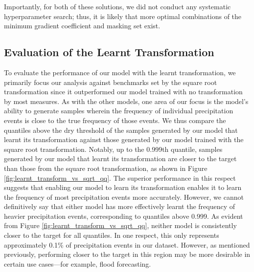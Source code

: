 \documentclass[ oneside,%
                    author={George Herbert},
                    degree={MSci},
                     title={Video Diffusion Models for Climate Simulations},
                  subtitle={}]{dissertation}
\begin{document}
Importantly, for both of these solutions, we did not conduct any systematic hyperparameter search; thus, it is likely that more optimal combinations of the minimum gradient coefficient and masking set exist.

\subsection{Evaluation of the Learnt Transformation}

To evaluate the performance of our model with the learnt transformation, we primarily focus our analysis against benchmarks set by the square root transformation since it outperformed our model trained with no transformation by most measures. As with the other models, one area of our focus is the model's ability to generate samples wherein the frequency of individual precipitation events is close to the true frequency of those events. We thus compare the quantiles above the dry threshold of the samples generated by our model that learnt its transformation against those generated by our model trained with the square root transformation. Notably, up to the 0.999th quantile, samples generated by our model that learnt its transformation are closer to the target than those from the square root transformation, as shown in Figure \ref{fig:learnt_transform_vs_sqrt_qq}. The superior performance in this respect suggests that enabling our model to learn its transformation enables it to learn the frequency of most precipitation events more accurately. However, we cannot definitively say that either model has more effectively learnt the frequency of heavier precipitation events, corresponding to quantiles above 0.999. As evident from Figure \ref{fig:learnt_transform_vs_sqrt_qq}, neither model is consistently closer to the target for all quantiles. In one respect, this only represents approximately 0.1\% of precipitation events in our dataset. However, as mentioned previously, performing closer to the target in this region may be more desirable in certain use cases---for example, flood forecasting.
\end{document}
